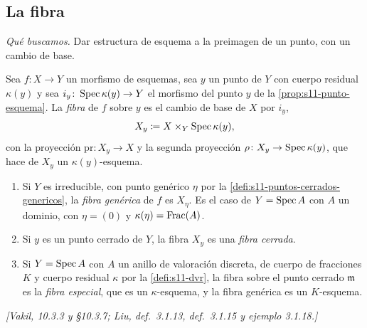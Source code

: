 \subsection{La fibra}

\emph{Qué buscamos.} Dar estructura de esquema a la preimagen de un punto, con un cambio de base.

\begin{defi}
\label{defi:s11-fibra}
Sea \(f\colon X\to Y\) un morfismo de esquemas, sea \(y\) un punto de \(Y\) con cuerpo residual \(\kappa(y)\) y sea \(i_y\colon\operatorname{Spec}\kappa(y)\to Y\) el morfismo del punto \(y\) de la \cref{prop:s11-punto-esquema}. La \emph{fibra} de \(f\) sobre \(y\) es el cambio de base de \(X\) por \(i_y\),
\[
 X_y\coloneqq X\times_Y\operatorname{Spec}\kappa(y),
\]
con la proyección \(\mathrm{pr}\colon X_y\to X\) y la segunda proyección \(\rho\colon X_y\to\operatorname{Spec}\kappa(y)\), que hace de \(X_y\) un \(\kappa(y)\)-esquema.
\begin{enumerate}[label=(\alph*)]
\item Si \(Y\) es irreducible, con punto genérico \(\eta\) por la \cref{defi:s11-puntos-cerrados-genericos}, la \emph{fibra genérica} de \(f\) es \(X_\eta\). Es el caso de \(Y=\operatorname{Spec} A\) con \(A\) un dominio, con \(\eta=(0)\) y \(\kappa(\eta)=\operatorname{Frac}(A)\).
\item Si \(y\) es un punto cerrado de \(Y\), la fibra \(X_y\) es una \emph{fibra cerrada}.
\item Si \(Y=\operatorname{Spec} A\) con \(A\) un anillo de valoración discreta, de cuerpo de fracciones \(K\) y cuerpo residual \(\kappa\) por la \cref{defi:s11-dvr}, la fibra sobre el punto cerrado \(\mathfrak m\) es la \emph{fibra especial}, que es un \(\kappa\)-esquema, y la fibra genérica es un \(K\)-esquema.
\end{enumerate}
\emph{[Vakil, 10.3.3 y \S10.3.7; Liu, def.~3.1.13, def.~3.1.15 y ejemplo 3.1.18.]}
\end{defi}

\begin{center}
\qquad\qquad
{}
\end{center}

